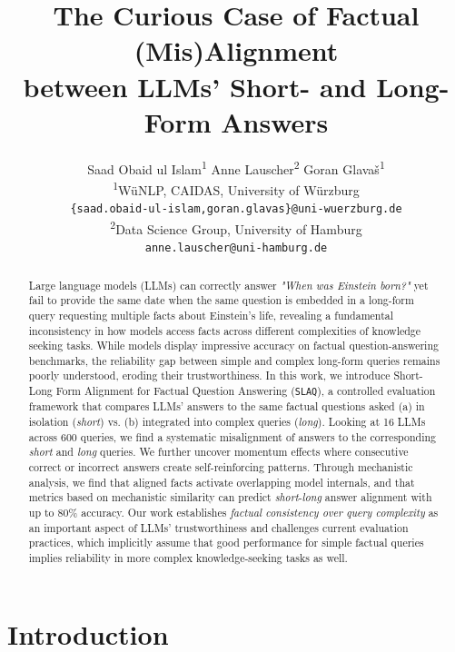 \documentclass[11pt]{article}
\title{The Curious Case of Factual (Mis)Alignment \\ between LLMs' Short- and Long-Form Answers}
\author{%
  Saad Obaid ul Islam\textsuperscript{1} \quad
  Anne Lauscher\textsuperscript{2} \quad
  Goran Glavaš\textsuperscript{1} \\[1ex]
  \textsuperscript{1}WüNLP, CAIDAS, University of Würzburg \\ \texttt{\{saad.obaid-ul-islam,goran.glavas\}@uni-wuerzburg.de} \\
  \textsuperscript{2}Data Science Group, University of Hamburg \\ \texttt{anne.lauscher@uni-hamburg.de}
}
\newcommand{\acrnm}{\texttt{SLAQ}\xspace}
\begin{document}
\maketitle
\begin{abstract}

Large language models (LLMs) can correctly answer \textit{"When was Einstein born?"} yet fail to provide the same date when the same question is embedded in a long-form query requesting multiple facts about Einstein's life, revealing a fundamental inconsistency in how models access facts across different complexities of knowledge seeking tasks. While models display impressive accuracy on factual question-answering benchmarks, the reliability gap between simple and complex long-form queries remains poorly understood, eroding their trustworthiness. 
In this work, we introduce Short-Long Form Alignment for Factual Question Answering (\acrnm), a controlled evaluation framework that compares LLMs' answers to the same factual questions asked (a) in isolation (\textit{short}) vs. (b) integrated into complex queries (\textit{long}). Looking at 16 LLMs across 600 queries, we find a systematic misalignment of answers to the corresponding \textit{short} and \textit{long} queries. 
We further uncover momentum effects where consecutive correct or incorrect answers create self-reinforcing patterns. Through mechanistic analysis, we find that aligned facts activate overlapping model internals, and that metrics based on mechanistic similarity can predict \textit{short}-\textit{long} answer alignment with up to 80\% accuracy. Our work establishes \textit{factual consistency over query complexity} as an important aspect of LLMs' trustworthiness and challenges current evaluation practices, which implicitly assume that good performance for simple factual queries implies reliability in more complex knowledge-seeking tasks as well.   

\end{abstract}
\section{Introduction}\label{sec:intro}
\end{document}
